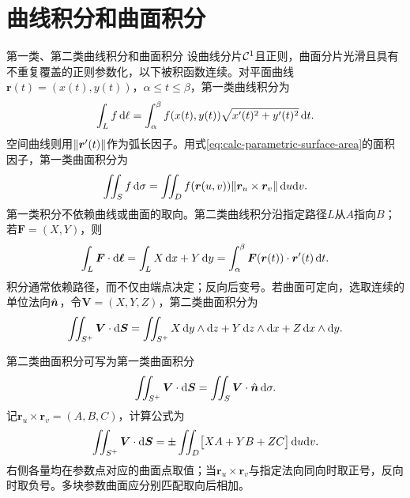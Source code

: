 \chapter{曲线积分和曲面积分}
\begin{definition}{第一类、第二类曲线积分和曲面积分}{}
    设曲线分片$\mathcal{C}^1$且正则，曲面分片光滑且具有不重复覆盖的正则参数化，以下被积函数连续。对平面曲线$\bm r(t) = (x(t),y(t))$，$\alpha \leq t \leq \beta$，第一类曲线积分为
    \begin{equation}\label{eq:calc-arclength-integral}
        \int_Lf\mathop{}\!\mathrm{d}\ell = \int_\alpha^\beta f(x(t),y(t))\sqrt{x'(t)^2 + y'(t)^2}\mathop{}\!\mathrm{d} t.
    \end{equation}
    空间曲线则用$\lVert\bm r'(t)\rVert$作为弧长因子。用式\eqref{eq:calc-parametric-surface-area}的面积因子，第一类曲面积分为
    \begin{equation}\label{eq:calc-scalar-surface-integral}
        \iint_Sf\mathop{}\!\mathrm{d}\sigma = \iint_Df(\bm r(u,v))\lVert\bm r_u \times \bm r_v\rVert\mathop{}\!\mathrm{d} u\mathrm{d} v.
    \end{equation}
    第一类积分不依赖曲线或曲面的取向。第二类曲线积分沿指定路径$L$从$A$指向$B$；若$\bm F = (X,Y)$，则
    \begin{equation}\label{eq:calc-line-integral}
        \int_L\bm F \cdot \mathop{}\!\mathrm{d}\bm\ell
        = \int_LX\mathop{}\!\mathrm{d} x + Y\mathop{}\!\mathrm{d} y
        = \int_\alpha^\beta\bm F(\bm r(t)) \cdot \bm r'(t)\mathop{}\!\mathrm{d} t.
    \end{equation}
    积分通常依赖路径，而不仅由端点决定；反向后变号。若曲面可定向，选取连续的单位法向$\mathop{}\!\hat{\bm{n}}$，令$\bm V = (X,Y,Z)$，第二类曲面积分为
    \begin{equation}\label{eq:calc-flux-integral}
        \iint_{S^+}\bm V \cdot \mathop{}\!\mathrm{d}\bm S
        = \iint_{S^+}X\mathop{}\!\mathrm{d} y \wedge \mathop{}\!\mathrm{d} z + Y\mathop{}\!\mathrm{d} z \wedge \mathop{}\!\mathrm{d} x + Z\mathop{}\!\mathrm{d} x \wedge \mathop{}\!\mathrm{d} y.
    \end{equation}
\end{definition}
第二类曲面积分可写为第一类曲面积分
\begin{equation}\label{eq:calc-flux-normal}
    \iint_{S^+}\bm V \cdot \mathop{}\!\mathrm{d}\bm S = \iint_S\bm V \cdot \mathop{}\!\hat{\bm{n}}\mathop{}\!\mathrm{d}\sigma.
\end{equation}
记$\bm r_u \times \bm r_v = (A,B,C)$，计算公式为
\begin{equation}\label{eq:calc-parametrized-flux}
    \iint_{S^+}\bm V \cdot \mathop{}\!\mathrm{d}\bm S
    = \pm\iint_D\bigl[XA + YB + ZC\bigr]\mathop{}\!\mathrm{d} u\mathrm{d} v.
\end{equation}
右侧各量均在参数点对应的曲面点取值；当$\bm r_u \times \bm r_v$与指定法向同向时取正号，反向时取负号。多块参数曲面应分别匹配取向后相加。
